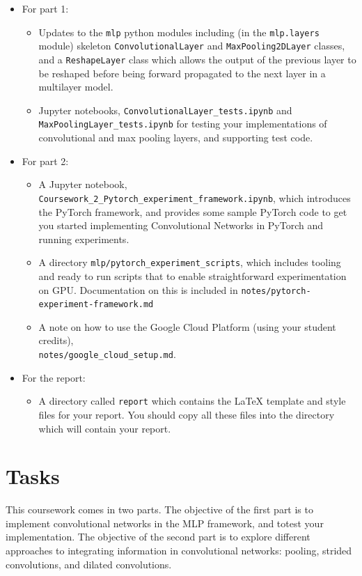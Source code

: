 \documentclass[11pt,]{article}
\begin{document}
\begin{itemize}
    \item For part 1:
    \begin{itemize}
        \item Updates to the \texttt{mlp} python modules including (in the \verb+mlp.layers+ module)  skeleton \texttt{ConvolutionalLayer} and \texttt{MaxPooling2DLayer} classes, and a \texttt{ReshapeLayer} class which allows the output of the previous layer to be reshaped before being forward propagated to the next layer in a multilayer model.
        \item Jupyter notebooks, \texttt{ConvolutionalLayer\_tests.ipynb} and \texttt{MaxPoolingLayer\_tests.ipynb} for testing your  implementations of convolutional and max pooling layers, and supporting test code.
    \end{itemize}
     \item For part 2:
    \begin{itemize}
        \item A Jupyter notebook, \texttt{Coursework\_2\_Pytorch\_experiment\_framework.ipynb}, which introduces the PyTorch framework, and provides some sample PyTorch code to get you started implementing Convolutional Networks in PyTorch and running experiments.
        \item A directory \texttt{mlp/pytorch\_experiment\_scripts}, which includes tooling and ready to run scripts that to enable straightforward experimentation on GPU.  Documentation on this is included in  \texttt{notes/pytorch-experiment-framework.md}
        \item A note on how to use the Google Cloud Platform (using your student credits),\\\texttt{notes/google\_cloud\_setup.md}.
    \end{itemize}
     \item For the report:
    \begin{itemize}
        \item  A directory called  \texttt{report} which contains the LaTeX template and style files for your report.  You should copy all these files into the directory which will contain your report.
    \end{itemize}
\end{itemize}


\section{Tasks}
\label{sec:tasks}
This coursework comes in two parts.  The objective of the first part is to implement convolutional networks in the MLP framework, and totest your implementation.  The objective of the second part is to explore different approaches to integrating information in convolutional networks: pooling, strided convolutions, and dilated convolutions.
\end{document}

